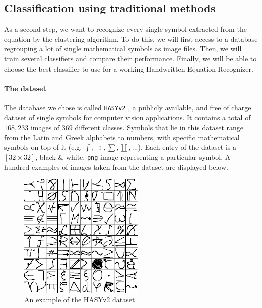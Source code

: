 \documentclass[twocolumn]{article}%
\begin{document}
	\subsection{Classification using traditional methods}
		As a second step, we want to recognize every single symbol extracted from the equation by the clustering algorithm. To do this, we will first access to a database regrouping a lot of single mathematical symbols as image files. Then, we will train several classifiers and compare their performance. Finally, we will be able to choose the best classifier to use for a working Handwritten Equation Recognizer.
		
	\paragraph{The dataset}
	The database we chose is called \texttt{HASYv2} \cite{hasyv2}, a publicly available, and free of charge dataset of
single symbols for computer vision applications. It contains a total of $168,233$ images of $369$ different classes. Symbols that lie in this dataset range from the Latin and Greek alphabets to numbers, with specific mathematical symbols on top of it (e.g. $\int, \supset, \sum, \coprod, ...$). Each entry of the dataset is a $[32\times32]$, black \& white, \texttt{png} image representing a particular symbol. A hundred examples of images taken from the dataset are displayed below.

	\begin{figure}[htp]
	\centering
	\includegraphics[scale=0.9]{images/hasyv2.png}
	\caption{An example of the HASYv2 dataset}
	\end{figure}
\end{document}
